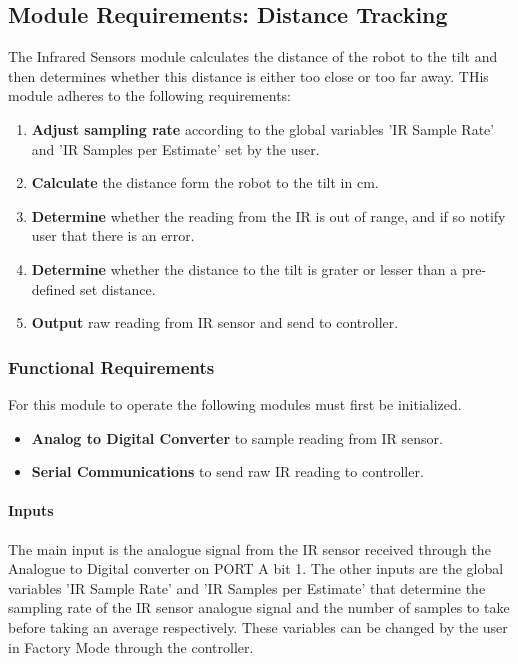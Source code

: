\documentclass[MTRX3700report.tex]{subfiles}
\begin{document}
\subsection{Module Requirements: Distance Tracking}
The Infrared Sensors module calculates the distance of the robot to the tilt and then determines whether this distance is either too close or too far away. THis module adheres to the following requirements:
\begin{enumerate}
	\item \textbf{Adjust sampling rate} according to the global variables 'IR Sample Rate' and 'IR Samples per Estimate' set by the user.
	\item \textbf{Calculate} the distance form the robot to the tilt in cm. 
	\item \textbf{Determine} whether the reading from the IR is out of range, and if so notify user that there is an error.	
	\item \textbf{Determine} whether the distance to the tilt is grater or lesser than a pre-defined set distance.
	\item \textbf{Output} raw reading from IR sensor and send to controller.
\end{enumerate} 

\subsubsection{Functional Requirements}
For this module to operate the following modules must first be initialized.
\begin{itemize}
	\item \textbf{Analog to Digital Converter} to sample reading from IR sensor.
	\item \textbf{Serial Communications} to send raw IR reading to controller.
\end{itemize}

\paragraph{Inputs}

The main input is the analogue signal from the IR sensor received through the Analogue to Digital converter on PORT A bit 1. 
The other inputs are the global variables 'IR Sample Rate' and 'IR Samples per Estimate' that determine the sampling rate of the IR sensor analogue signal and the number of samples to take before taking an average respectively. These variables can be changed by the user in Factory Mode through the controller.  
\end{document}
